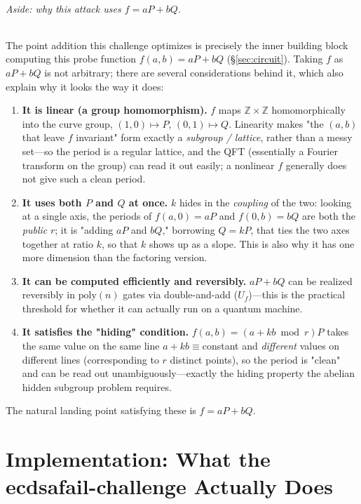 \documentclass[11pt]{article}
\newcommand{\secref}[1]{\hyperref[#1]{\S\ref*{#1}}}
\begin{document}
\paragraph{Aside: why this attack uses $f=aP+bQ$.}
The point addition this challenge optimizes is precisely the inner building block computing this probe function $f(a,b)=aP+bQ$ (\secref{sec:circuit}). Taking $f$ as $aP+bQ$ is not arbitrary;
there are several considerations behind it, which also explain why it looks the way it does:
\begin{enumerate}[leftmargin=1.9em]
\item \textbf{It is linear (a group homomorphism).} $f$ maps $\mathbb{Z}\times\mathbb{Z}$ homomorphically into the curve group, $(1,0)\mapsto P$, $(0,1)\mapsto Q$.
Linearity makes "the $(a,b)$ that leave $f$ invariant" form exactly a \emph{subgroup / lattice}, rather than a messy set---so the period is a regular lattice, and the QFT (essentially a
Fourier transform on the group) can read it out easily; a nonlinear $f$ generally does not give such a clean period.
\item \textbf{It uses both $P$ and $Q$ at once.} $k$ hides in the \emph{coupling} of the two: looking at a single axis, the periods of $f(a,0)=aP$ and $f(0,b)=bQ$ are both the
\emph{public} $r$; it is "adding $aP$ and $bQ$," borrowing $Q=kP$, that ties the two axes together at ratio $k$, so that $k$ shows up as a slope. This is also why it has one more dimension than the factoring
version.
\item \textbf{It can be computed efficiently and reversibly.} $aP+bQ$ can be realized reversibly in $\mathrm{poly}(n)$ gates via double-and-add ($U_f$)---this is the practical
threshold for whether it can actually run on a quantum machine.
\item \textbf{It satisfies the "hiding" condition.} $f(a,b)=(a+kb\bmod r)P$ takes the same value on the same line $a+kb\equiv$constant and \emph{different}
values on different lines (corresponding to $r$ distinct points), so the period is "clean" and can be read out unambiguously---exactly the hiding property the abelian hidden subgroup problem requires.
\end{enumerate}
The natural landing point satisfying these is $f=aP+bQ$.

\part{Implementation: What the ecdsafail-challenge Actually Does}
\end{document}

